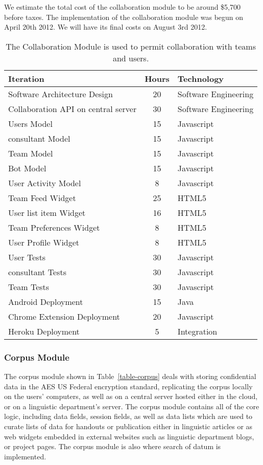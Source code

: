 \documentclass[12 pt]{article}
\begin{document}
We estimate the total cost of the collaboration module to be around \$5,700 before taxes. The implementation of the collaboration module was begun on April 20th 2012. We will have its final costs on August 3rd 2012.
\begin{table}[h]
\begin{center}
  \begin{tabular}{ | lcl | }
\hline
Iteration&	Hours&	Technology	\\
\hline
Software Architecture Design&	20&	Software Engineering	\\ 
Collaboration API on central server&	30&	Software Engineering\\ 
Users Model&	15&	Javascript	\\ 
consultant Model&	15&	Javascript	\\ 
Team Model&	15&	Javascript	\\ 
Bot Model&	15&	Javascript	\\ 
User Activity Model&	8&	Javascript	\\ 
Team Feed Widget&	25&	HTML5	\\ 
User list item Widget&	16&	HTML5	\\ 
Team Preferences Widget&	8&	HTML5	\\ 
User Profile Widget&	8&	HTML5	\\ 
User Tests&	30&	Javascript \\ 
consultant Tests&	30&	Javascript	\\ 
Team Tests&	30&	Javascript	\\ 
Android Deployment&	15&	Java	\\ 
Chrome Extension Deployment&	20&	Javascript \\ 
Heroku Deployment&	5&	Integration	\\ 
\hline
  \end{tabular}
  \caption{The Collaboration Module is used to permit collaboration with teams and users. }
\label{table-collaboration}
  \end{center}
\end{table}


\newpage
\subsubsection{Corpus Module}
The corpus module shown in Table~\ref{table-corpus} deals with storing confidential data in the AES US Federal encryption standard, replicating the corpus locally on the  users' computers, as well as on a central server hosted either in the cloud, or on a linguistic department's server. The corpus module contains all of the core logic, including data fields, session fields, as well as data lists which are used to curate lists of data for handouts or publication either in linguistic articles or as web widgets embedded in external websites such as linguistic department blogs, or project pages. The corpus module is also where search of datum is implemented. 
\end{document}
